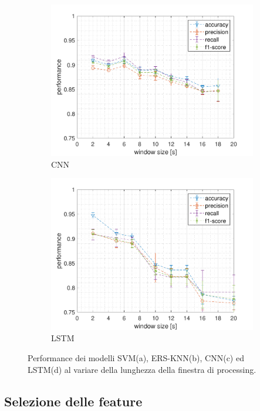 \begin{figure}[!htb]
\begin{subfigure}{.45\textwidth}
        \includegraphics[width=\textwidth]{figure/cnn_window.pdf}
        \caption{CNN}
        \label{fig:window:cnn}
    \end{subfigure}
    \begin{subfigure}{.45\textwidth}
        \includegraphics[width=\textwidth]{figure/lstm_window.pdf}
        \caption{LSTM}
        \label{fig:window:lstm}
    \end{subfigure}
    \caption{Performance dei modelli SVM(a), ERS-KNN(b), CNN(c) ed LSTM(d) al variare della lunghezza della finestra di processing.}
    \label{fig:window}
\end{figure}

\subsection{Selezione delle feature}
\label{ssec:selezione-delle-feature}

